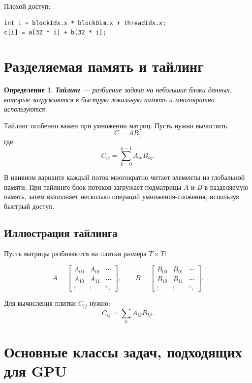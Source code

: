 \documentclass[12pt,a4paper]{article}
\newtheorem{definition}{Определение}
\begin{document}
Плохой доступ:

\begin{lstlisting}[style=cuda]
int i = blockIdx.x * blockDim.x + threadIdx.x;
c[i] = a[32 * i] + b[32 * i];
\end{lstlisting}

\section{Разделяемая память и тайлинг}

\begin{definition}
\textbf{Тайлинг} --- разбиение задачи на небольшие блоки данных, которые загружаются в быструю локальную память и многократно используются.
\end{definition}

Тайлинг особенно важен при умножении матриц. Пусть нужно вычислить:
\[
    C = AB,
\]
где
\[
    C_{ij} = \sum_{k=0}^{n-1} A_{ik}B_{kj}.
\]

В наивном варианте каждый поток многократно читает элементы из глобальной памяти. При тайлинге блок потоков загружает подматрицы $A$ и $B$ в разделяемую память, затем выполняет несколько операций умножения-сложения, используя быстрый доступ.

\subsection{Иллюстрация тайлинга}

Пусть матрицы разбиваются на плитки размера $T \times T$:

\[
A =
\begin{bmatrix}
A_{00} & A_{01} & \cdots \\
A_{10} & A_{11} & \cdots \\
\vdots & \vdots & \ddots
\end{bmatrix},
\qquad
B =
\begin{bmatrix}
B_{00} & B_{01} & \cdots \\
B_{10} & B_{11} & \cdots \\
\vdots & \vdots & \ddots
\end{bmatrix}.
\]

Для вычисления плитки $C_{ij}$ нужно:
\[
    C_{ij} = \sum_k A_{ik}B_{kj}.
\]

\section{Основные классы задач, подходящих для GPU}
\end{document}
